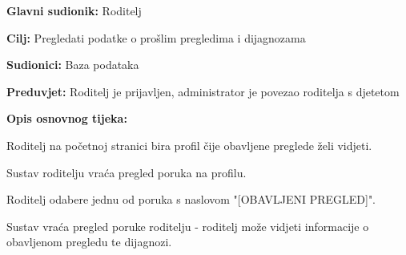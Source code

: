 					\noindent {}
					\begin{packed_item}
						
						\item \textbf{Glavni sudionik: }Roditelj
						\item  \textbf{Cilj:} Pregledati podatke o prošlim pregledima i dijagnozama
						\item  \textbf{Sudionici:} Baza podataka
						\item  \textbf{Preduvjet:} Roditelj je prijavljen, administrator je povezao roditelja s djetetom
						\item  \textbf{Opis osnovnog tijeka:}
						
						\item[] \begin{packed_enum}
							
							\item Roditelj na početnoj stranici bira profil čije obavljene preglede želi vidjeti.
							\item Sustav roditelju vraća pregled poruka na profilu.
							\item Roditelj odabere jednu od poruka s naslovom "[OBAVLJENI PREGLED]".
							\item Sustav vraća pregled poruke roditelju - roditelj može vidjeti informacije o obavljenom pregledu te dijagnozi.
						\end{packed_enum}
						
						
					\end{packed_item}
					
				
					
